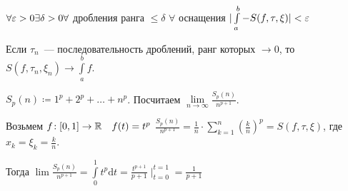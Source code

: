 \begin{consequence}
    $\forall \varepsilon > 0 \exists \delta > 0 \forall$ дробления ранга  $\le \delta$ $\forall$ оснащения  $|\int\limits_a^b - S(f, \tau, \xi)| < \varepsilon$
\end{consequence}
\begin{consequence}
    Если $\tau_n$~--- последовательность дроблений, ранг которых  $\to 0$, то $S(f, \tau_n, \xi_n) \to \int\limits_a^b f$.  
\end{consequence}
\begin{example}
    $S_p(n) \coloneqq 1^p + 2^p + \ldots + n^p$. Посчитаем $\lim\limits_{n \to \infty} \frac{S_p(n)}{n^{p+1}}$.

    Возьмем $f\!: [0,1] \to \mathbb{R}\quad f(t) = t^p$
    $\frac{S_p(n)}{n^{p+1}} = \frac{1}{n} \cdot \sum\limits_{k=1}^n \left(\frac{k}{n}\right)^p = S(f, \tau, \xi)$, где $x_k = \xi_k = \frac{k}{n}$.

    Тогда $\lim \frac{S_p(n)}{n^{p+1}} = \int\limits_0^1 t^p \mathrm{d}t = \frac{t^{p+1}}{p+1} \mid_{t=0}^{t=1} = \frac{1}{p+1}$
\end{example}

